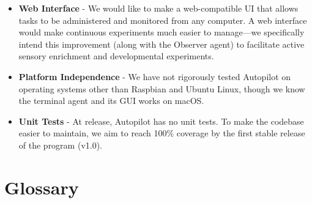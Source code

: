 \documentclass[nohyper, justified, notitlepage, marginals=raggedright,twoside=false,debug]{tufte-autopilot}
\begin{document}
\begin{fullwidth}
\begin{itemize}
    \item \textbf{Web Interface} - We would like to make a web-compatible UI that allows tasks to be administered and monitored from any computer. A web interface would make continuous experiments much easier to manage---we specifically intend this improvement (along with the Observer agent) to facilitate active sensory enrichment\citep{wellsSensoryStimulationEnvironmental2009,engineerEnvironmentalEnrichmentImproves2004a} and developmental experiments.
    \item \textbf{Platform Independence} - We have not rigorously tested Autopilot on operating systems other than Raspbian and Ubuntu Linux, though we know the terminal agent and its GUI works on macOS. 
    \item \textbf{Unit Tests} - At release, Autopilot has no unit tests. To make the codebase easier to maintain, we aim to reach 100\% coverage by the first stable release of the program (v1.0).
\end{itemize}
\end{fullwidth}


\chapter{Glossary}
\end{document}
